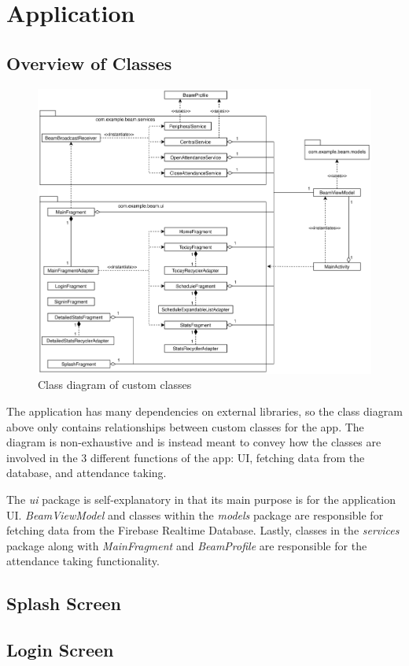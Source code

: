 \documentclass[../report.tex]{subfiles}
\begin{document}
\section{Application}
\subsection{Overview of Classes}
\begin{figure}[H]
	\centering
	\includegraphics[width=.8\linewidth]{../images/07/02-01-class-diagram.png}
	\caption{Class diagram of custom classes}
	\label{fig:07-02-01-class-diagram}
\end{figure}
The application has many dependencies on external libraries, so the class diagram above only contains relationships between custom classes for the app. The diagram is non-exhaustive and is instead meant to convey how the classes are involved in the 3 different functions of the app: UI, fetching data from the database, and attendance taking.

The \textit{ui} package is self-explanatory in that its main purpose is for the application UI. \textit{BeamViewModel} and classes within the \textit{models} package are responsible for fetching data from the Firebase Realtime Database. Lastly, classes in the \textit{services} package along with \textit{MainFragment} and \textit{BeamProfile} are responsible for the attendance taking functionality. 

\subsection{Splash Screen}

\subsection{Login Screen}
\end{document}
